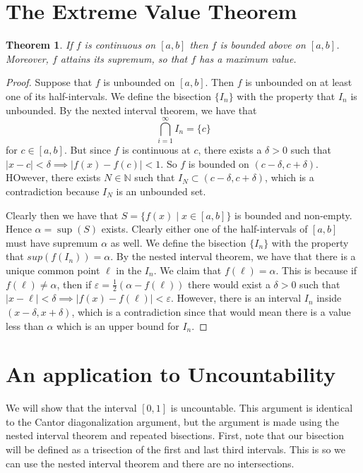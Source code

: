 \documentclass[12pt]{article}
\theoremstyle{definition}
\theoremstyle{plain}
\newtheorem{thm}{Theorem}
\begin{document}
\section{The Extreme Value Theorem}

\begin{thm}
If $f$ is continuous on $[a, b]$ then $f$ is bounded above on $[a, b]$. Moreover, $f$ attains its supremum, so that $f$ has a maximum value.
\end{thm}

\begin{proof}
Suppose that $f$ is unbounded on $[a, b]$. Then $f$ is unbounded on at least one of its half-intervals. We define the bisection $\{I_n\}$ with the property that $I_n$ is unbounded. By the nexted interval theorem, we have that 
\[\bigcap_{i = 1}^{\infty}I_n = \{c\}\] for $c \in [a, b]$. But since $f$ is continuous at $c$, there exists a $\delta > 0$ such that $|x - c| < \delta \implies |f(x) - f(c)| < 1$. So $f$ is bounded on $(c - \delta, c + \delta)$. HOwever, there exists $N \in \mathbb{N}$ such that $I_N \subset (c - \delta, c + \delta)$, which is a contradiction because $I_N$ is an unbounded set.

Clearly then we have that $S = \{f(x) \mid x \in [a,b]\}$ is bounded and non-empty. Hence $\alpha = \sup(S)$ exists. Clearly either one of the half-intervals of $[a, b]$ must have supremum $\alpha$ as well. We define the bisection $\{I_n\}$ with the property that $sup(f(I_n)) = \alpha$. By the nested interval theorem, we have that there is a unique common point $\ell$ in the $I_n$. We claim that $f(\ell) = \alpha$. This is because if $f(\ell) \neq \alpha$, then if $\varepsilon = \frac{1}{2}(\alpha - f(\ell))$ there would exist a $\delta > 0$ such that $|x - \ell| < \delta \implies |f(x) - f(\ell)| < \varepsilon$. However, there is an interval $I_n$ inside $(x - \delta, x + \delta)$, which is a contradiction since that would mean there is a value less than $\alpha$ which is an upper bound for $I_n$.
\end{proof}

\section{An application to Uncountability}

We will show that the interval $[0, 1]$ is uncountable. This argument is identical to the Cantor diagonalization argument, but the argument is made using the nested interval theorem and repeated bisections. First, note that our bisection will be defined as a trisection of the first and last third intervals. This is so we can use the nested interval theorem and there are no intersections.
\end{document}
